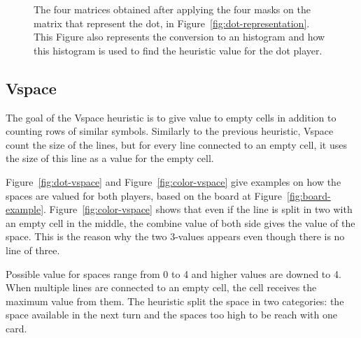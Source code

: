 \documentclass[runningheads]{llncs}
\begin{document}
\begin{figure}[ht]
		\caption{The four matrices obtained after applying the four masks on the matrix that represent the dot, in Figure~\ref{fig:dot-representation}.
						This Figure also represents the conversion to an histogram and how this histogram is used to find the heuristic value for the dot player.}
		\label{fig:convolution-results}
\end{figure}

\clearpage
\subsection{Vspace}
\label{sec:vspace}
The goal of the Vspace heuristic is to give value to empty
cells in addition to counting rows of similar
symbols. Similarly to the previous heuristic,
Vspace count the size of the lines, but for every
line connected to an empty cell, it uses the
size of this line as a value for the empty cell.

Figure~\ref{fig:dot-vspace} and
Figure~\ref{fig:color-vspace} give examples on
how the spaces are valued for both players, based
on the board at Figure~\ref{fig:board-example}.
Figure~\ref{fig:color-vspace} shows that even if
the line is split in two with an empty cell in the
middle, the combine value of both side gives the
value of the space. This is the reason why the two
3-values appears even though there is no line of
three.

Possible value for spaces range from 0 to 4 and
higher values are downed to 4. When multiple lines
are connected to an empty cell, the cell receives
the maximum value from them. The heuristic split the
space in two categories: the space available in
the next turn and the spaces too high to be reach
with one card.
\end{document}
